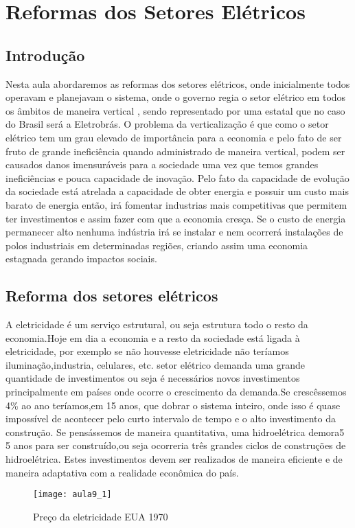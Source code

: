 \section{Reformas dos Setores Elétricos}

\subsection{Introdução}
    Nesta aula abordaremos as reformas dos setores elétricos, onde inicialmente todos operavam e planejavam o sistema, onde o governo regia o setor elétrico em todos os âmbitos de maneira vertical , sendo representado por uma estatal que no caso do Brasil será a Eletrobrás.
    O problema da verticalização é que como o setor elétrico tem um grau elevado de importância para a economia e pelo fato de ser fruto de grande ineficiência quando administrado de maneira vertical, podem ser causados danos imensuráveis para a sociedade uma vez que temos grandes ineficiências e pouca capacidade de inovação. Pelo fato da capacidade de evolução da sociedade está atrelada a capacidade de obter energia e possuir um custo mais barato de energia então, irá fomentar industrias mais competitivas que permitem ter investimentos e assim fazer com que a economia cresça. Se o custo de energia permanecer alto nenhuma indústria irá se instalar e nem ocorrerá instalações de polos industriais em determinadas regiões, criando assim uma economia estagnada gerando impactos sociais.
    
\subsection{Reforma dos setores elétricos}
  A eletricidade é um serviço estrutural, ou seja estrutura todo o resto da economia.Hoje em dia a economia e a resto da sociedade está ligada à eletricidade, por exemplo se não houvesse eletricidade não teríamos iluminação,industria, celulares, etc. setor elétrico demanda uma grande quantidade de investimentos ou seja é necessários novos investimentos principalmente em países onde ocorre o crescimento da demanda.Se crescêssemos 4\% ao ano teríamos,em 15 anos, que dobrar o sistema inteiro, onde isso é quase impossível de acontecer pelo curto intervalo de tempo e o alto investimento da construção. Se pensássemos de maneira quantitativa, uma hidroelétrica demora5 5 anos para ser construído,ou seja ocorreria três grandes
ciclos de construções de hidroelétrica. Estes investimentos devem ser realizados de maneira eficiente e de maneira adaptativa com a realidade econômica do país.
\begin{figure}[H]
\begin{centering}
\texttt{[image: aula9\_1]}\protect\caption{\label{fig:aula9-1} Preço da eletricidade EUA 1970}
\end{centering}
\end{figure}

